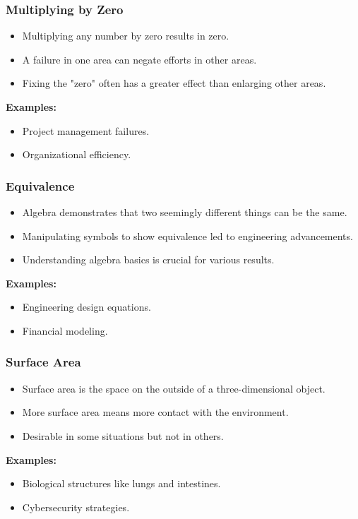 \begin{frame}[fragile]\frametitle{Multiplying by Zero}
\begin{itemize}
    \item Multiplying any number by zero results in zero.
    \item A failure in one area can negate efforts in other areas.
    \item Fixing the "zero" often has a greater effect than enlarging other areas.
\end{itemize}
\textbf{Examples:}
\begin{itemize}
    \item Project management failures.
    \item Organizational efficiency.
\end{itemize}
\end{frame}

\begin{frame}[fragile]\frametitle{Equivalence}
\begin{itemize}
    \item Algebra demonstrates that two seemingly different things can be the same.
    \item Manipulating symbols to show equivalence led to engineering advancements.
    \item Understanding algebra basics is crucial for various results.
\end{itemize}
\textbf{Examples:}
\begin{itemize}
    \item Engineering design equations.
    \item Financial modeling.
\end{itemize}
\end{frame}

\begin{frame}[fragile]\frametitle{Surface Area}
\begin{itemize}
    \item Surface area is the space on the outside of a three-dimensional object.
    \item More surface area means more contact with the environment.
    \item Desirable in some situations but not in others.
\end{itemize}
\textbf{Examples:}
\begin{itemize}
    \item Biological structures like lungs and intestines.
    \item Cybersecurity strategies.
\end{itemize}
\end{frame}

